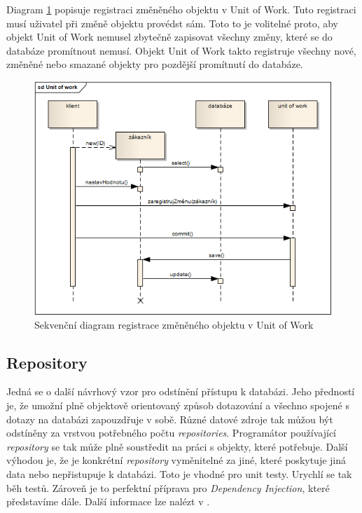 \documentclass[11pt,twoside,a4paper]{book}
\begin{document}
Diagram \ref{fig:uow} popisuje registraci změněného objektu v Unit of Work. Tuto registraci musí uživatel při změně objektu provédst sám. Toto to je volitelné proto, aby objekt Unit of Work nemusel zbytečně zapisovat všechny změny, které se do databáze promítnout nemusí. Objekt Unit of Work takto registruje všechny nové, změněné nebo smazané objekty pro pozdější promítnutí do databáze.
\begin{figure}[h!]
\begin{center}
\includegraphics[scale=0.7]{figures/uow}
\caption{Sekvenční diagram registrace změněného objektu v Unit of Work}
\label{fig:uow}
\end{center}
\end{figure}


\subsection{Repository}

Jedná se o další návrhový vzor pro odstínění přístupu k databázi. Jeho předností je, že umožní plně objektově orientovaný způsob dotazování a všechno spojené s dotazy na databázi zapouzdřuje v sobě. Různé datové zdroje tak můžou být odstíněny za vrstvou potřebného počtu \textit{repositories}. Programátor používající \textit{repository} se tak může plně soustředit na práci s objekty, které potřebuje. Další výhodou je, že je konkrétní \textit{repository} vyměnitelné za jiné, které poskytuje jiná data nebo nepřistupuje k databázi. Toto je vhodné pro unit testy. Urychlí se tak běh testů. Zároveň je to perfektní příprava pro \textit{Dependency Injection}, které představíme dále. Další informace lze nalézt v \citep{PEAA}.
\end{document}
